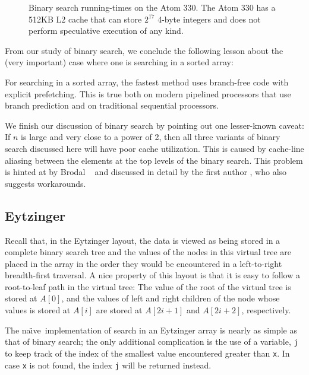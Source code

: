 \documentclass{patmorin}
\newcommand{\naive}{na\"{\i}ve}
\begin{document}
\begin{figure}
   \caption{Binary search running-times on the Atom 330. The Atom 330
   has a 512KB L2 cache that can store $2^{17}$ 4-byte integers and does
   not perform speculative execution of any kind.}
\end{figure}

From our study of binary search, we conclude the following lesson about
the (very important) case where one is searching in a sorted array:

\begin{lesson}
  For searching in a sorted array, the fastest method uses branch-free
  code with explicit prefetching.  This is true both on modern pipelined
  processors that use branch prediction and on traditional sequential
  processors.
\end{lesson}

We finish our discussion of binary search by pointing out one lesser-known
caveat:  If $n$ is large and very close to a power of 2, then all three
variants of binary search discussed here will have poor cache utilization.
This is caused by cache-line aliasing between the elements at the top
levels of the binary search.  This problem is hinted at by Brodal \etal\
\cite[Section~XX]{X} and discussed in detail by the first author \cite{X},
who also suggests workarounds.

\subsection{Eytzinger}

Recall that, in the Eytzinger layout, the data is viewed as being
stored in a complete binary search tree and the values of the nodes in
this virtual tree are placed in the array in the order they would be
encountered in a left-to-right breadth-first traversal.  A nice property
of this layout is that it is easy to follow a root-to-leaf path in the
virtual tree: The value of the root of the virtual tree is stored at
$A[0]$, and the values of left and right children of the node whose values
is stored at $A[i]$ are stored at $A[2i+1]$ and $A[2i+2]$, respectively.

The \naive\ implementation of search in an Eytzinger array is nearly
as simple as that of binary search; the only additional complication is
the use of a variable, \texttt{j} to keep track of the index
of the smallest value encountered greater than \texttt{x}.
In case \texttt{x} is not found, the index \texttt{j}
will be returned instead.
\end{document}
